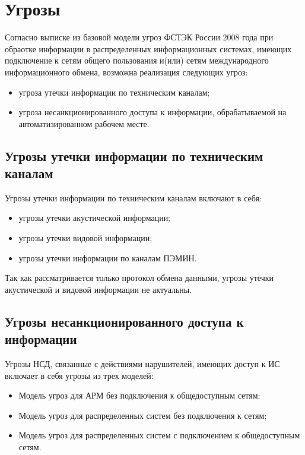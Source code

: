 \newpage
\section{Угрозы}
\setcounter{figure}{0}

Согласно выписке из базовой модели угроз ФСТЭК России 2008 года при обраотке информации в распределенных информационных системах, имеющих подключение к сетям общего пользования и(или) сетям международного информационного обмена, возможна реализация следующих угроз:

\begin{itemize}
 \item угроза утечки информации по техническим каналам;
 \item угроза несанкционированного доступа к информации, обрабатываемой на автоматизированном рабочем месте.
\end{itemize}

\subsection{Угрозы утечки информации по техническим каналам}

Угрозы утечки информации по техническим каналам включают в себя:

\begin{itemize}
 \item угрозы утечки акустической информации;
 \item угрозы утечки видовой информации;
 \item угрозы утечки информации по каналам ПЭМИН.
\end{itemize}

Так как рассматривается только протокол обмена данными, угрозы утечки акустической и видовой информации не актуальны.

\subsection{Угрозы несанкционированного доступа к информации}

Угрозы НСД, связанные с действиями нарушителей, имеющих доступ к ИС включает в себя угрозы из трех моделей:

\begin{itemize}
 \item Модель угроз для АРМ без подключения к общедоступным сетям;
 \item Модель угроз для распределенных систем без подключения к сетям;
 \item Модель угроз для распределенных систем с подключением к общедоступным сетям.
\end{itemize}

